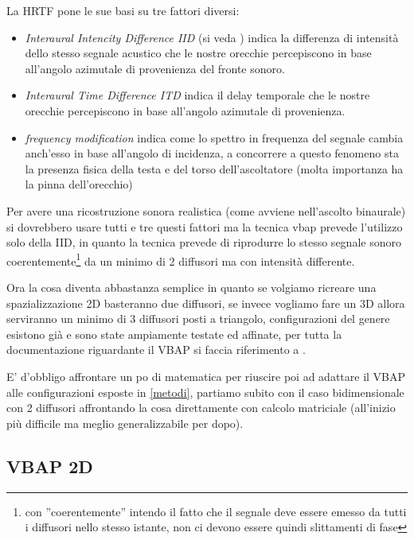 \documentclass[12pt,a4paper]{report}
\begin{document}
La HRTF pone le sue basi su tre fattori diversi:

\begin{itemize}
\item \textit{Interaural Intencity Difference IID} (si veda \cite{iid}) indica la differenza di intensità dello stesso segnale acustico che le nostre orecchie percepiscono in base all'angolo azimutale di provenienza del fronte sonoro.
\item \textit{Interaural Time  Difference ITD} indica il delay temporale che le nostre orecchie percepiscono in base all'angolo azimutale di provenienza.
\item \textit{frequency modification} indica come lo spettro in frequenza del segnale cambia anch'esso in base all'angolo di incidenza, a concorrere a questo fenomeno sta la presenza fisica della testa e del torso dell'ascoltatore (molta importanza ha la pinna dell'orecchio)
\end{itemize}

Per avere una ricostruzione sonora realistica (come avviene nell'ascolto binaurale) si dovrebbero usare tutti e tre questi fattori ma la tecnica vbap prevede l'utilizzo solo della IID, in quanto la tecnica prevede di riprodurre lo stesso segnale sonoro coerentemente\footnote{con ''coerentemente'' intendo il fatto che il segnale deve essere emesso da tutti i diffusori nello stesso istante, non ci devono essere quindi slittamenti di fase} da un minimo di 2 diffusori ma con intensità differente.

Ora la cosa diventa abbastanza semplice in quanto se volgiamo ricreare una spazializzazione 2D basteranno due diffusori, se invece vogliamo fare un 3D allora serviranno un minimo di 3 diffusori posti a triangolo, configurazioni del genere esistono già e sono state ampiamente testate ed affinate, per tutta la documentazione riguardante il VBAP si faccia riferimento a \cite{vbap}.

E' d'obbligo affrontare un po di matematica per riuscire poi ad adattare il VBAP alle configurazioni esposte in \ref{metodi}, partiamo subito con il caso bidimensionale con 2 diffusori affrontando la cosa direttamente con calcolo matriciale (all'inizio più difficile ma meglio generalizzabile per dopo).

\subsection{VBAP 2D}\label{c}
\end{document}
